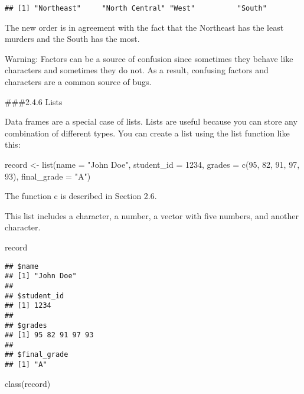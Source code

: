 \documentclass[
]{article}
\newenvironment{Shaded}{\begin{snugshade}}{\end{snugshade}}
\newcommand{\AttributeTok}[1]{\textcolor[rgb]{0.77,0.63,0.00}{#1}}
\newcommand{\DecValTok}[1]{\textcolor[rgb]{0.00,0.00,0.81}{#1}}
\newcommand{\FunctionTok}[1]{\textcolor[rgb]{0.00,0.00,0.00}{#1}}
\newcommand{\NormalTok}[1]{#1}
\newcommand{\OtherTok}[1]{\textcolor[rgb]{0.56,0.35,0.01}{#1}}
\newcommand{\StringTok}[1]{\textcolor[rgb]{0.31,0.60,0.02}{#1}}
\begin{document}
\begin{verbatim}
## [1] "Northeast"     "North Central" "West"          "South"
\end{verbatim}

The new order is in agreement with the fact that the Northeast has the
least murders and the South has the most.

Warning: Factors can be a source of confusion since sometimes they
behave like characters and sometimes they do not. As a result, confusing
factors and characters are a common source of bugs.

\#\#\#2.4.6 Lists

Data frames are a special case of lists. Lists are useful because you
can store any combination of different types. You can create a list
using the list function like this:

\begin{Shaded}
\begin{Highlighting}[]
\NormalTok{record }\OtherTok{\textless{}{-}} \FunctionTok{list}\NormalTok{(}\AttributeTok{name =} \StringTok{"John Doe"}\NormalTok{,}
             \AttributeTok{student\_id =} \DecValTok{1234}\NormalTok{,}
             \AttributeTok{grades =} \FunctionTok{c}\NormalTok{(}\DecValTok{95}\NormalTok{, }\DecValTok{82}\NormalTok{, }\DecValTok{91}\NormalTok{, }\DecValTok{97}\NormalTok{, }\DecValTok{93}\NormalTok{),}
             \AttributeTok{final\_grade =} \StringTok{"A"}\NormalTok{)}
\end{Highlighting}
\end{Shaded}

The function c is described in Section 2.6.

This list includes a character, a number, a vector with five numbers,
and another character.

\begin{Shaded}
\begin{Highlighting}[]
\NormalTok{record}
\end{Highlighting}
\end{Shaded}

\begin{verbatim}
## $name
## [1] "John Doe"
## 
## $student_id
## [1] 1234
## 
## $grades
## [1] 95 82 91 97 93
## 
## $final_grade
## [1] "A"
\end{verbatim}

\begin{Shaded}
\begin{Highlighting}[]
\FunctionTok{class}\NormalTok{(record)}
\end{Highlighting}
\end{Shaded}
\end{document}
